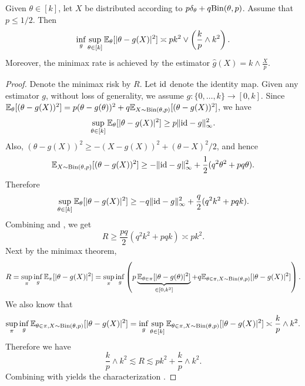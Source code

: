 \begin{lemma}
\label{lmm:mixbin}	
	Given $\theta\in [k]$, let $X$ be distributed according to $p \delta_\theta + q \mathrm{Bin}(\theta,p)$. Assume that $p\leq 1/2$. Then
\begin{equation}
\inf_g \sup_{\theta \in [k]} \mathbb{E}_\theta[|\theta-g(X)|^2] \asymp p k^2 \vee \left(  \frac{k}{p} \wedge k^2  \right).
\label{eq:mixbin}
\end{equation}	
Moreover, the minimax rate is achieved by the estimator $ \widehat{g}(X) = k\wedge \frac{X}{p} $.
\end{lemma}
\begin{proof}
	Denote the minimax risk by $R$.
	Let $\mathrm{id}$ denote the identity map.
	Given  any estimator $g$, without loss of generality, we assume $g: \{0,\ldots,k\} \to [0,k]$.
	Since $\mathbb{E}_\theta[(\theta-g(X))^2] = p (\theta-g(\theta))^2 +  q \mathbb{E}_{X\sim\mathrm{Bin}(\theta,p)}[(\theta-g(X))^2]$, we have
	\begin{equation}
	\sup_{\theta \in [k]} \mathbb{E}_\theta[|\theta-g(X)|^2] \geq p \|\mathrm{id}-g\|_\infty^2.
	\label{eq:lb1}
	\end{equation}
	Also,
	$(\theta-g(X))^2
	\geq - (X-g(X))^2 + (\theta-X)^2/2$, and hence
	\[
	\mathbb{E}_{X\sim\mathrm{Bin}(\theta,p)}[(\theta-g(X))^2] 
	\geq   - \|\mathrm{id}-g\|_\infty^2 +  \frac{1}{2} (q^2\theta^2+pq\theta).
	\]
	Therefore
	\begin{equation}
	\sup_{\theta \in [k]} \mathbb{E}_\theta[|\theta-g(X)|^2] \geq - q \|\mathrm{id}-g\|_\infty^2 +  \frac{q}{2} (q^2k ^2+pqk).	
	\label{eq:lb2}
	\end{equation}
	Combining  and , we get
	\begin{equation}
	R \geq \frac{pq}{2} (q^2k ^2+pqk) \asymp pk^2.
	\label{eq:lb3}
	\end{equation}
	Next by the minimax theorem, 
	\[
	R = \sup_\pi \inf_g \mathbb{E}_\pi[|\theta-g(X)|^2] 
	= \sup_\pi \inf_g  \left( p \underbrace{\mathbb{E}_{\theta\in\pi}[|\theta-g(\theta)|^2]}_{\in [0,k^2]}  + q \mathbb{E}_{\theta\in \pi,X\sim\mathrm{Bin}(\theta,p)} [|\theta-g(X)|^2]   \right).
	\]
	We also know that
	\[
\sup_\pi \inf_g   \mathbb{E}_{\theta\in \pi,X\sim\mathrm{Bin}(\theta,p)}[|\theta-g(X)|^2]  
=  \inf_g \sup_{\theta \in [k]} \mathbb{E}_{\theta\in \pi,X\sim\mathrm{Bin}(\theta,p)}[|\theta-g(X)|^2]  \asymp \frac{k}{p} \wedge k^2. 
	\]
	Therefore we have
	\[
\frac{k}{p} \wedge k^2
	\lesssim R \lesssim pk^2 + \frac{k}{p} \wedge k^2.
	\]
	Combining with  yields the characterization .
\end{proof}

